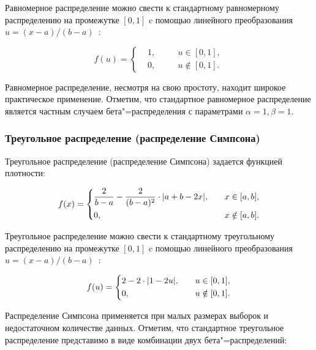 \documentclass[a4paper, article, 14pt]{extarticle}
\begin{document}
Равномерное распределение можно свести к стандартному равномерному распределению на промежутке $[0, 1]$ c помощью линейного преобразования $u = (x - a) / (b - a)$~\cite{koroluk}:

\begin{equation}\label{eq:standard_uniform_distribtuion}
	f(u) =
	\left\{
		\begin{aligned}
			&1, \quad && u \in [0, 1],\\
			&0, \quad && u \notin [0, 1].
		\end{aligned}
	\right.
\end{equation}

Равномерное распределение, несмотря на свою простоту, находит широкое практическое применение. Отметим, что стандартное равномерное распределение является частным случаем бета"=распределения с параметрами $\alpha = 1, \beta = 1$.

\subsubsection{Треугольное распределение (распределение Симпсона)}\label{sec:simpson_distribtuion}

Треугольное распределение (распределение Симпсона) задается функцией плотности:

\begin{equation}\label{eq:simpson_distribtuion}
	f(x) =
	\left\{
		\begin{aligned}
			&\frac{2}{b - a} - \frac{2}{(b - a)^2} \cdot \abs*{a + b - 2x}, \quad && x \in [a, b],\\
			&0, \quad && x \notin [a, b].
		\end{aligned}
	\right.
\end{equation}

Треугольное распределение можно свести к стандартному треугольному распределению на промежутке $[0, 1]$ c помощью линейного преобразования $u = (x - a) / (b - a)$~\cite{koroluk}:

\begin{equation}\label{eq:standard_simpson_distribtuion}
	f(u) =
	\left\{
		\begin{aligned}
			&2 - 2 \cdot \abs*{1 - 2u}, \quad && u \in [0, 1],\\
			&0, \quad && u \notin [0, 1].
		\end{aligned}
	\right.
\end{equation}

Распределение Симпсона применяется при малых размерах выборок и недостаточном количестве данных. Отметим, что стандартное треугольное распределение представимо в виде комбинации двух бета"=распределений:
\end{document}
